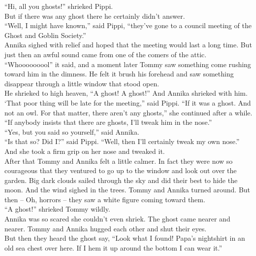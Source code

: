 \documentclass{standard}
\begin{document}
“Hi, all you ghosts!” shrieked Pippi.\\

But if there was any ghost there he certainly didn’t answer.\\

“Well, I might have known,” said Pippi, “they’ve gone to a council meeting of the Ghost and Goblin Society.”\\

Annika sighed with relief and hoped that the meeting would last a long time. But just then an awful sound came from one of the comers of the attic.\\

“Whooooooool” it said, and a moment later Tommy saw something come rushing toward him in the dimness. He felt it brush his forehead and saw something disappear through a little window that stood open.\\

He shrieked to high heaven, “A ghost! A ghost!” And Annika shrieked with him.\\

‘That poor thing will be late for the meeting,” said Pippi. “If it was a ghost. And not an owl. For that matter, there aren’t any ghosts,” she continued after a while. “If anybody insists that there are ghosts, I’ll tweak him in the nose.”\\

“Yes, but you said so yourself,” said Annika.\\

“Is that so? Did I?” said Pippi. “Well, then I’ll certainly tweak my own nose.” And she took a firm grip on her nose and tweaked it.\\

After that Tommy and Annika felt a little calmer. In fact they were now so courageous that they ventured to go up to the window and look out over the garden. Big dark clouds sailed through the sky and did their best to hide the moon. And the wind sighed in the trees. Tommy and Annika turned around. But then -- Oh, horrors -- they saw a white figure coming toward them.\\

“A ghost!” shrieked Tommy wildly.\\

Annika was so scared she couldn’t even shriek. The ghost came nearer and nearer. Tommy and Annika hugged each other and shut their eyes.\\

But then they heard the ghost say, “Look what I found! Papa’s nightshirt in an old sea chest over here. If I hem it up around the bottom I can wear it.”\\
\end{document}
